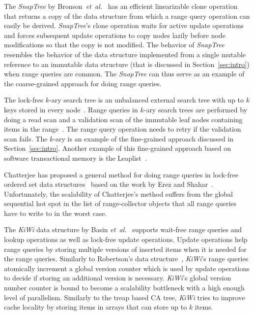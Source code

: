 \documentclass[a4paper,UKenglish]{oasics-v2016}
\newcommand{\etal}{\mbox{\textit{et al.}}\xspace}
\newcommand{\kary}{\mbox{$k$-ary}\xspace}
\begin{document}
The \emph{SnapTree} by Bronson~\etal~\cite{bronson2010practical} has an efficient linearizable clone operation that returns a copy of the data structure from which a range query operation can easily be derived.
\emph{SnapTree}'s clone operation waits for active update operations and forces subsequent update operations to copy nodes lazily before node modifications so that the copy is not modified.
The behavior of \emph{SnapTree} resembles the behavior of the data structure implemented from a single mutable reference to an immutable data structure (that is discussed in Section~\ref{sec:intro}) when range queries are common. %
The \emph{SnapTree} can thus serve as an example of the coarse-grained approach for doing range queries.

The lock-free \kary{} search tree is an unbalanced external search tree with up to $k$ keys stored in every node~\cite{NBKASearchTree}. %
Range queries in \kary{} search trees are performed by doing a read scan and a validation scan of the immutable leaf nodes containing items in the range~\cite{RangeQKArySeachTree}.
The range query operation needs to retry if the validation scan fails.
The \kary{} is an example of the fine-grained approach discussed in Section~\ref{sec:intro}.
Another example of this fine-grained approach based on software transactional memory is the Leaplist~\cite{AvniLeaplist}.
  
Chatterjee has proposed a general method for doing range queries in lock-free ordered set data structures~\cite{ChatterjeeLFRangeQueries} based on the work by Erez and Shahar~\cite{Petrank2013}.
Unfortunately, the scalability of Chatterjee's method suffers from the global sequential hot spot in the list of range-collector objects that all range queries have to write to in the worst case. 

The \emph{KiWi} data structure by Basin \etal~\cite{BasinKiWi} supports wait-free range queries and lookup operations as well as lock-free update operations. %
Update operations help range queries by storing multiple versions of inserted items when it is needed for the range queries.
Similarly to Robertson's data structure~\cite{CFRangeQueries}, \emph{KiWi}'s range queries atomically increment a global version counter which is used by update operations to decide if storing an additional version is necessary.
\emph{KiWi}'s global version number counter is bound to become a scalability bottleneck with a high enough level of parallelism. %
Similarly to the treap based CA tree, \emph{KiWi} tries to improve cache locality by storing items in arrays that can store up to $k$ items.
\end{document}
